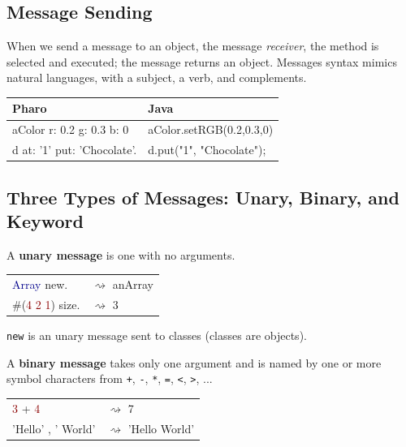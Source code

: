 \documentclass[notumble]{leaflet}
\newcommand{\code}[1]{\foreignlanguage{english}{\texttt{#1}}}
\begin{document}
\subsection{Message Sending}
When we send a message to an object, the message
\emph{receiver}, the method is selected and executed; the message returns an object. Messages syntax mimics
natural languages, with a subject, a verb, and complements. 


\noindent
\begin{tabularx}{\linewidth}{@{}lX@{}}
        \toprule
        \textbf{Pharo} & \textbf{Java}\\
\midrule
aColor r: 0.2 g: 0.3 b: 0&aColor.setRGB(0.2,0.3,0)\\
d at: '1' put: 'Chocolate'.&d.put("1", "Chocolate");\\
\midrule
\end{tabularx}


\subsection{Three Types of Messages: Unary, Binary, and Keyword}

A \textbf{unary message} is one with no arguments.

\noindent
\begin{tabularx}{\linewidth}{@{}lX@{}}
        \toprule
      \textcolor{darkBlue}{Array} new.& $\rightsquigarrow$ anArray \\
      \#(\textcolor{darkRed}{4 2 1}) size.& $\rightsquigarrow$ 3\\
       \midrule
\end{tabularx}

\code{new} is an unary message sent to classes (classes are objects). 

A \textbf{binary message} takes only one
argument and is named by one or more symbol characters from \code{+}, \code{-}, \code{*}, \code{=}, \code{<}, \code{>}, ...

\noindent
\begin{tabularx}{\linewidth}{@{}lX@{}}
        \toprule
      \textcolor{darkRed}{3} + \textcolor{darkRed}{4}& $\rightsquigarrow$ 7 \\
     \textcolor{string}{'Hello'} , \textcolor{string}{' World'}& $\rightsquigarrow$ 'Hello World'\\
       \midrule
\end{tabularx}
\end{document}

